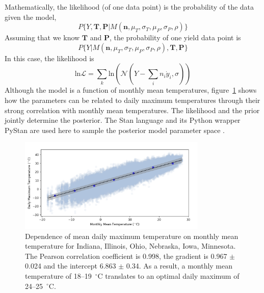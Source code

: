 \documentclass[12pt]{iopart}
\newcommand{\remove}[1]{}
\newcommand{\add}[1]{#1}
\begin{document}
Mathematically, the likelihood (of one data point) is the probability of the data given the model,
\begin{equation}
P\{ Y, \boldsymbol{T}, \boldsymbol{P} | M\left(\boldsymbol{n}, \mu_T, \sigma_{T}, \mu_P,\sigma_{P},\rho\right) \}
\end{equation}
Assuming that we know $\boldsymbol{T}$ and $\boldsymbol{P}$, the probability of one yield data point is 
\begin{equation}
P\{ Y | M(\boldsymbol{n}, \mu_T, \sigma_{T}, \mu_P,\sigma_{P},\rho),  \boldsymbol{T}, \boldsymbol{P} \}
\end{equation}
In this case, the likelihood is 
\begin{equation}
\textrm{ln} \mathcal{L} = \sum_k \textrm{ln} \left( \mathcal{N}(Y - \sum_i n_i \dot{y}_i, \sigma ) \right)
\end{equation}
Although the model is \remove{formulated using}\add{a function of} monthly mean temperatures, figure~\ref{fig:daily_vs_monthly} shows how the parameters can be related to daily maximum temperatures through their strong correlation with monthly mean temperatures. The likelihood and the prior jointly determine the posterior. The Stan language and its Python wrapper PyStan are used here to sample the posterior model parameter space \citep{carpenter:2017}.

\begin{figure}
\centering
\includegraphics[width=0.8\textwidth]{./figures/daily_max_vs_monthly_mean_temp2.png}
\caption{\label{fig:daily_vs_monthly} Dependence of mean daily maximum temperature on monthly mean temperature for Indiana, Illinois, Ohio, Nebraska, Iowa, Minnesota. The Pearson correlation coefficient is 0.998, the gradient is 0.967 $\pm$ 0.024 and the intercept 6.863 $\pm$ 0.34. As a result, a monthly mean temperature of 18--19~$^\circ$C translates to an optimal daily maximum of 24--25~$^\circ$C. }
\end{figure}
\end{document}
